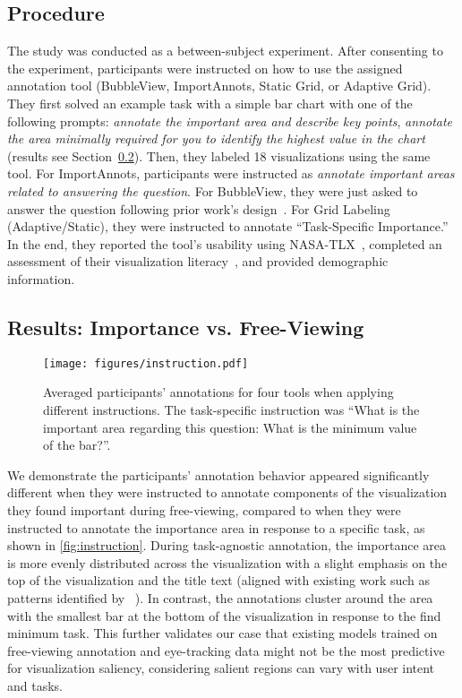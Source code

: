 \subsection{Procedure}
The study was conducted as a between-subject experiment. After consenting to the experiment, participants were instructed on how to use the assigned annotation tool (BubbleView, ImportAnnots, Static Grid, or Adaptive Grid). %
They first solved an example task with a simple bar chart with one of the following prompts: \textit{annotate the important area and describe key points}, \textit{annotate the area minimally required for you to identify the highest value in the chart} (results see Section~\ref{results:taskbasedagnostic}).
Then, they labeled 18 visualizations using the same tool. 
For ImportAnnots, participants were instructed as \textit{annotate important areas related to answering the question}. 
For BubbleView, they were just asked to answer the question following prior work's design~\cite{salchartQA}. 
For Grid Labeling (Adaptive/Static), they were instructed to annotate ``Task-Specific Importance.'' 
In the end, they reported the tool's usability using NASA-TLX~\cite{hart1988development}, completed an assessment of their visualization literacy~\cite{mini-vlat}, and provided demographic information.

\subsection{Results: Importance vs. Free-Viewing} \label{results:taskbasedagnostic}

\begin{figure}[ht]
    \centering
    \texttt{[image: figures/instruction.pdf]}
    \caption{Averaged participants' annotations for four tools when applying different instructions. The task-specific instruction was ``What is the important area regarding this question: What is the minimum value of the bar?''.}
    \label{fig:instruction}
    \vspace{-3mm}
\end{figure}

We demonstrate the participants' annotation behavior appeared significantly different when they were instructed to annotate components of the visualization they found important during free-viewing, compared to when they were instructed to annotate the importance area in response to a specific task, as shown in \autoref{fig:instruction}.
During task-agnostic annotation, the importance area is more evenly distributed across the visualization with a slight emphasis on the top of the visualization and the title text (aligned with existing work such as patterns identified by ~\cite{graphicDesignImportance}).
In contrast, the annotations cluster around the area with the smallest bar at the bottom of the visualization in response to the find minimum task.
This further validates our case that existing models trained on free-viewing annotation and eye-tracking data might not be the most predictive for visualization saliency, considering salient regions can vary with user intent and tasks.


